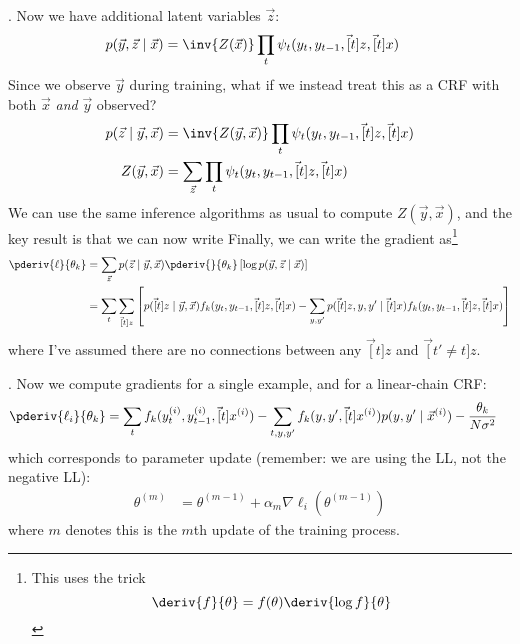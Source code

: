 \documentclass[11pt]{article}
\begin{document}
\myspace \p {}. Now we have additional latent variables $\vec z$:
\begin{align}
p(\vec y, \vec z \mid \vec x) &= \inv{Z(\vec x)} \prod_t \psi_t(y_t, y_{t-1}, \vec[t]{z}, \vec[t]{x}) 
\end{align}
Since we observe $\vec y$ during training, what if we instead treat this as a CRF with both $\vec x$ \textit{and} $\vec y$ observed?
\begin{align}
p(\vec z \mid \vec y, \vec x) 
&= \inv{Z(\vec y, \vec x)} \prod_t \psi_t(y_t, y_{t-1}, \vec[t]{z}, \vec[t]{x}) \\
Z(\vec y, \vec x) 
&= \sum_{\vec z} \prod_t  \psi_t(y_t, y_{t-1}, \vec[t]{z}, \vec[t]{x})
\end{align}
We can use the same inference algorithms as usual to compute $Z(\vec y, \vec x)$, and the key result is that we can now write
Finally, we can write the gradient as\footnote{This uses the trick $$ \deriv{f}{\theta} = f(\theta) \deriv{\log f}{\theta} $$}
\begin{align}
\pderiv{\ell}{\theta_k}
&= \sum_{\vec z} p(\vec z \mid \vec y, \vec x) \pderiv{}{\theta_k}\left[ \log p(\vec y, \vec z \mid \vec x) \right]\\
&= \sum_t \sum_{\vec[t]{z}} \left[ p(\vec[t]{z} \mid \vec y, \vec x) f_k(y_t, y_{t-1}, \vec[t]{z}, \vec[t]{x})
-  \sum_{y, y'} p(\vec[t]{z}, y, y' \mid \vec[t]{x}) f_k(y_t, y_{t-1}, \vec[t]{z}, \vec[t]{x}) \right]
\end{align}
where I've assumed there are no connections between any $\vec[t]{z}$ and $\vec[t' \ne t]{z}$.



\myspace
\p {}. Now we compute gradients for a single example, and for a linear-chain CRF:
\begin{align}
\pderiv{\ell_i}{\theta_k} 
&= \sum_{t} f_k(y_t^{(i)}, y_{t-1}^{(i)}, \vec[t]{x}^{(i)})
- \sum_{t,y,y'} f_k(y, y', \vec[t]{x}^{(i)}) p(y, y' \mid \vec{x}^{(i)})
- \frac{\theta_k}{N \sigma^2}
\end{align}
which corresponds to parameter update (remember: we are using the LL, not the negative LL):
\begin{align}
\theta^{(m)}
&= \theta^{(m-1)} + \alpha_m \nabla \ell_i(\theta^{(m-1)})
\end{align}
where $m$ denotes this is the $m$th update of the training process.
\end{document}
